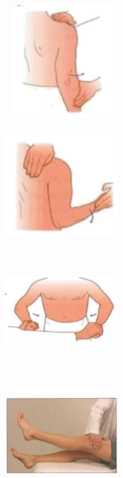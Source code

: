 \documentclass[a4paper,12pt,openany,oneside]{book}
\begin{document}
{\begin{figure}[H]
		\begin{subfigure}[t]{.25\textwidth}
			\includegraphics[width=5cm,height=5cm]{./clinicalPhysioPic/motorSystem/supraspinatus.jpg}
		\end{subfigure}
		\hspace{\fill}
		\begin{subfigure}[t]{.25\textwidth}
			\includegraphics[width=5cm,height=5cm]{./clinicalPhysioPic/motorSystem/infraspinatus.jpg}
		\end{subfigure}
		\hspace{\fill}
		\begin{subfigure}[t]{.25\textwidth}
			\includegraphics[width=5cm,height=5cm]{./clinicalPhysioPic/motorSystem/pectoralisMajor.jpg}
		\end{subfigure}
		\hspace{\fill}
		\begin{subfigure}[t]{.25\textwidth}
			\includegraphics[width=5cm,height=5cm]{./clinicalPhysioPic/motorSystem/hipFlexion.jpg}

\end{subfigure}
\end{figure}}
\end{document}
